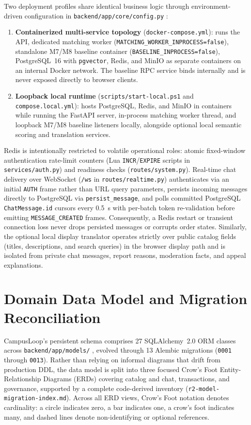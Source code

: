 Two deployment profiles share identical business logic through environment-driven configuration in \texttt{backend/app/core/config.py} \cite{pydanticDocs}:
\begin{enumerate}
  \item \textbf{Containerized multi-service topology} (\texttt{docker-compose.yml}): runs the API, dedicated matching worker (\texttt{MATCHING\_WORKER\_INPROCESS=false}), standalone M7/M8 baseline container (\texttt{BASELINE\_INPROCESS=false}), PostgreSQL~16 with \texttt{pgvector}, Redis, and MinIO as separate containers on an internal Docker network. The baseline RPC service binds internally and is never exposed directly to browser clients.
  \item \textbf{Loopback local runtime} (\texttt{scripts/start-local.ps1} and \texttt{compose.local.yml}): hosts PostgreSQL, Redis, and MinIO in containers while running the FastAPI server, in-process matching worker thread, and loopback M7/M8 baseline listeners locally, alongside optional local semantic scoring and translation services.
\end{enumerate}

Redis is intentionally restricted to volatile operational roles: atomic fixed-window authentication rate-limit counters (Lua \texttt{INCR}/\texttt{EXPIRE} scripts in \texttt{services/auth.py}) and readiness checks (\texttt{routes/system.py}). Real-time chat delivery over WebSocket (\texttt{/ws} in \texttt{routes/realtime.py}) authenticates via an initial \texttt{AUTH} frame rather than URL query parameters, persists incoming messages directly to PostgreSQL via \texttt{persist\_message}, and polls committed PostgreSQL \texttt{ChatMessage.id} cursors every 0.5~s with per-batch token re-validation before emitting \texttt{MESSAGE\_CREATED} frames. Consequently, a Redis restart or transient connection loss never drops persisted messages or corrupts order states. Similarly, the optional local display translator operates strictly over public catalog fields (titles, descriptions, and search queries) in the browser display path and is isolated from private chat messages, report reasons, moderation facts, and appeal explanations.

\section{Domain Data Model and Migration Reconciliation}
\label{sec:design-data-model}

CampusLoop's persistent schema comprises 27 SQLAlchemy~2.0 ORM classes across \texttt{backend/app/models/} \cite{sqlalchemy20}, evolved through 13 Alembic migrations (\texttt{0001} through \texttt{0013}). Rather than relying on informal diagrams that drift from production DDL, the data model is split into three focused Crow's Foot Entity-Relationship Diagrams (ERDs) covering catalog and chat, transactions, and governance, supported by a complete code-derived inventory (\texttt{r2-model-migration-index.md}). Across all ERD views, Crow's Foot notation denotes cardinality: a circle indicates zero, a bar indicates one, a crow's foot indicates many, and dashed lines denote non-identifying or optional references.

